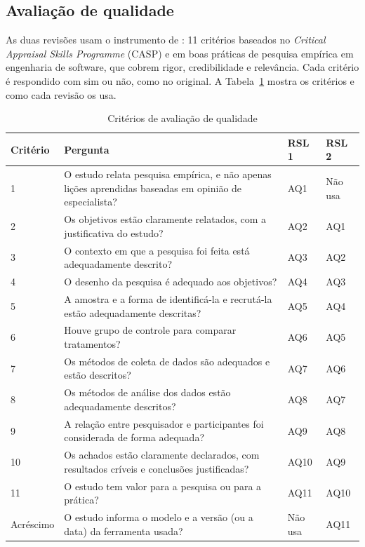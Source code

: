 \subsection{Avaliação de qualidade}
\label{sec:metodologia-qualidade}

As duas revisões usam o instrumento de : 11
critérios baseados no \textit{Critical Appraisal Skills Programme} (CASP) e em
boas práticas de pesquisa empírica em engenharia de software, que cobrem
rigor, credibilidade e relevância. Cada critério é respondido com sim ou não,
como no original. A Tabela~\ref{tab:qualidade} mostra os critérios e como
cada revisão os usa.

\begin{table}[htbp]
	\centering
	\caption{Critérios de avaliação de qualidade}
	\label{tab:qualidade}
	\small
	\begin{tabular}{p{1.8cm}p{8.8cm}p{1.4cm}p{1.4cm}}
		\hline
		\textbf{Critério} & \textbf{Pergunta} & \textbf{RSL 1} &
		\textbf{RSL 2} \\
		\hline
		1 & O estudo relata pesquisa empírica, e não apenas lições aprendidas
		baseadas em opinião de especialista? & AQ1 & Não usa \\
		2 & Os objetivos estão claramente relatados, com a justificativa do
		estudo? & AQ2 & AQ1 \\
		3 & O contexto em que a pesquisa foi feita está adequadamente
		descrito? & AQ3 & AQ2 \\
		4 & O desenho da pesquisa é adequado aos objetivos? & AQ4 & AQ3 \\
		5 & A amostra e a forma de identificá-la e recrutá-la estão
		adequadamente descritas? & AQ5 & AQ4 \\
		6 & Houve grupo de controle para comparar tratamentos? & AQ6 & AQ5 \\
		7 & Os métodos de coleta de dados são adequados e estão descritos? &
		AQ7 & AQ6 \\
		8 & Os métodos de análise dos dados estão adequadamente descritos? &
		AQ8 & AQ7 \\
		9 & A relação entre pesquisador e participantes foi considerada de
		forma adequada? & AQ9 & AQ8 \\
		10 & Os achados estão claramente declarados, com resultados críveis e
		conclusões justificadas? & AQ10 & AQ9 \\
		11 & O estudo tem valor para a pesquisa ou para a prática? & AQ11 &
		AQ10 \\
		Acréscimo & O estudo informa o modelo e a versão (ou a data) da
		ferramenta usada? & Não usa & AQ11 \\
		\hline
	\end{tabular}
\end{table}

